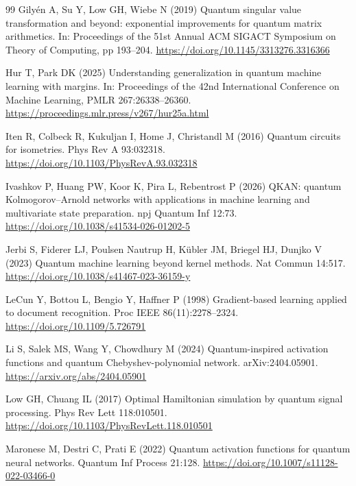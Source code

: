 \documentclass[pdflatex,sn-mathphys,NameDate,iicol]{sn-jnl}
\begin{document}
\begin{thebibliography}{99}
Gily{\'e}n A, Su Y, Low GH, Wiebe N (2019) Quantum singular value
transformation and beyond: exponential improvements for quantum matrix
arithmetics. In: Proceedings of the 51st Annual ACM SIGACT Symposium on
Theory of Computing, pp 193--204.
\url{https://doi.org/10.1145/3313276.3316366}

Hur T, Park DK (2025) Understanding generalization in quantum machine
learning with margins. In: Proceedings of the 42nd International Conference
on Machine Learning, PMLR 267:26338--26360.
\url{https://proceedings.mlr.press/v267/hur25a.html}

Iten R, Colbeck R, Kukuljan I, Home J, Christandl M (2016) Quantum circuits
for isometries. Phys Rev A 93:032318.
\url{https://doi.org/10.1103/PhysRevA.93.032318}

Ivashkov P, Huang PW, Koor K, Pira L, Rebentrost P (2026) QKAN: quantum
Kolmogorov--Arnold networks with applications in machine learning and
multivariate state preparation. npj Quantum Inf 12:73.
\url{https://doi.org/10.1038/s41534-026-01202-5}

Jerbi S, Fiderer LJ, Poulsen Nautrup H, K{\"u}bler JM, Briegel HJ, Dunjko V
(2023) Quantum machine learning beyond kernel methods. Nat Commun 14:517.
\url{https://doi.org/10.1038/s41467-023-36159-y}

LeCun Y, Bottou L, Bengio Y, Haffner P (1998) Gradient-based learning applied
to document recognition. Proc IEEE 86(11):2278--2324.
\url{https://doi.org/10.1109/5.726791}

Li S, Salek MS, Wang Y, Chowdhury M (2024) Quantum-inspired activation
functions and quantum Chebyshev-polynomial network. arXiv:2404.05901.
\url{https://arxiv.org/abs/2404.05901}

Low GH, Chuang IL (2017) Optimal Hamiltonian simulation by quantum signal
processing. Phys Rev Lett 118:010501.
\url{https://doi.org/10.1103/PhysRevLett.118.010501}

Maronese M, Destri C, Prati E (2022) Quantum activation functions for
quantum neural networks. Quantum Inf Process 21:128.
\url{https://doi.org/10.1007/s11128-022-03466-0}


\end{thebibliography}
\end{document}
